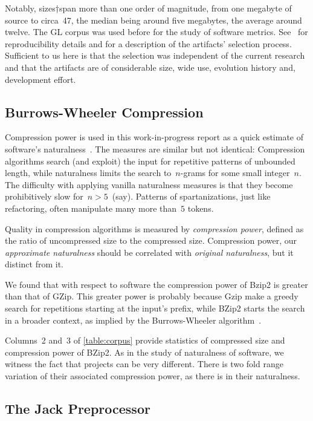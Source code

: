 \begin{description}
\begin{description}
Notably, sizes†span more than one
order of magnitude, from one megabyte of source to circa~47, the median being
around five megabytes, the average around twelve. The GL corpus was used before
for the study of software metrics.  See~\cite{Gil:Lalouche:16,Gil:Lalouche:16b}
for reproducibility details and for a description of the artifacts' selection
process. Sufficient to us here is that the selection was independent of the
current research and that the artifacts are of considerable size, wide use,
evolution history and, development effort.

\subsection{Burrows-Wheeler Compression}
Compression power is used in this work-in-progress report as a quick estimate
of software's naturalness~\cite{Hindle:Bar:Su:Gabel:Devanbu:12}. The measures
are similar but not identical: Compression algorithms search (and exploit) the
input for repetitive patterns of unbounded length, while naturalness limits the
search to~$n$-grams for some small integer~$n$. The difficulty with applying
vanilla naturalness measures is that they become prohibitively slow
for~$n>5$~(say). Patterns of spartanizations, just like refactoring, often
manipulate many more than~$5$ tokens.

Quality in compression algorithms is measured by \emph{compression power},
defined as the ratio of uncompressed size to the compressed size. Compression
power, our \emph{approximate naturalness} should be correlated with
\emph{original naturalness}, but it distinct from it.

We found that with respect to \Java software the compression power of Bzip2 is
greater than that of GZip. This greater power is probably because Gzip make a
greedy search for repetitions starting at the input's prefix, while BZip2
starts the search in a broader context, as implied by the Burrows-Wheeler
algorithm~\cite{Burrows:Wheeler:94}.

Columns~2 and~3 of \cref{table:corpus} provide statistics of compressed size
and compression power of BZip2. As in the study of
naturalness of software, we witness the fact that projects can be very
different. There is two fold range variation of their associated compression
power, as there is in their naturalness.

\subsection{The Jack Preprocessor}


\end{description}
\end{description}
